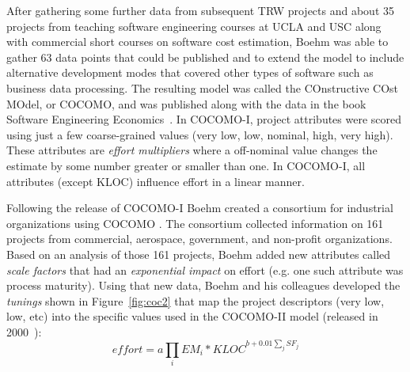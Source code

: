 \documentclass[smallcondesed]{svjour3}
\newcommand{\fig}[1]{Figure~\ref{fig:#1}}
\begin{document}


After  gathering some further data from subsequent
TRW projects and about 35 projects from teaching
software engineering courses at UCLA and USC along
with commercial short courses on software cost
estimation, Boehm was able to gather 63 data points
that could be published and to extend the model to
include alternative development modes that covered
other types of software such as business data
processing.  The resulting model was called the
COnstructive COst MOdel, or COCOMO, and was
published along with the data in the book Software
Engineering Economics~\cite{boehm81}. 
In COCOMO-I, project attributes
were scored using just a few coarse-grained values (very low,
low, nominal, high, very high). These attributes
are {\em effort multipliers} where
a off-nominal value changes the estimate by some number
greater or smaller than one.
In COCOMO-I, all attributes (except KLOC)
influence effort in a linear manner.

Following the release of COCOMO-I Boehm created a consortium for
industrial organizations using COCOMO .
The consortium
collected information on 161 projects from commercial,
aerospace, government, and non-profit organizations.
Based on an analysis of those 161 projects, Boehm
 added  new attributes called {\em scale factors}
that had an {\em exponential impact}
on effort (e.g. one such attribute was process maturity).
Using that new data, Boehm and his colleagues developed
the  {\em tunings} shown in \fig{coc2} that
map the project descriptors (very low, low, etc)
into the specific values used in the COCOMO-II model
(released in 2000~\cite{boehm00b}):
\begin{equation}\label{eq:cocII}
\mathit{effort}=a\prod_i EM_i *\mathit{KLOC}^{b+0.01\sum_j SF_j}
\end{equation}
\end{document}
